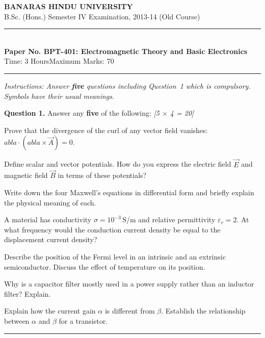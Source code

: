 \documentclass[11pt,a4paper]{article}
\newcommand{\pts}[1]{\hfill   \textit{[#1]}}
\begin{document}
\begin{center}
  {\large\bfseries BANARAS HINDU UNIVERSITY}\\[2pt]
  {\normalsize B.Sc. (Hons.) Semester IV Examination, 2013-14 (Old Course)}\\[6pt]
  \rule{0.8\linewidth}{0.5pt}\\[6pt]
  {\large\bfseries Paper No. BPT-401: Electromagnetic Theory and Basic Electronics}\\[4pt]
  {\normalsize Time: 3 Hours\hfill Maximum Marks: 70}
\end{center}
\rule{\linewidth}{0.4pt}
\smallskip



\noindent   \textit{Instructions: Answer   \textbf{five} questions including Question~1 which is compulsory. Symbols have their usual meanings.}
\bigskip




\noindent   \textbf{Question 1.} Answer any   \textbf{five} of the following: \pts{5 $ \times$ 4 = 20}

\begin{parts}
  \item Prove that the divergence of the curl of any vector field vanishes: $
abla \cdot (
abla  \times \vec{A}) = 0$.
  \item Define scalar and vector potentials. How do you express the electric field $\vec{E}$ and magnetic field $\vec{B}$ in terms of these potentials?
  \item Write down the four Maxwell's equations in differential form and briefly explain the physical meaning of each.
  \item A material has conductivity $\sigma = 10^{-3}\, \text{S/m}$ and relative permittivity $\varepsilon_r = 2$. At what frequency would the conduction current density be equal to the displacement current density?
  \item Describe the position of the Fermi level in an intrinsic and an extrinsic semiconductor. Discuss the effect of temperature on its position.
  \item Why is a capacitor filter mostly used in a power supply rather than an inductor filter? Explain.
  \item Explain how the current gain $\alpha$ is different from $\beta$. Establish the relationship between $\alpha$ and $\beta$ for a transistor.
\end{parts}

\medskip\rule{\linewidth}{0.2pt}
\end{document}
